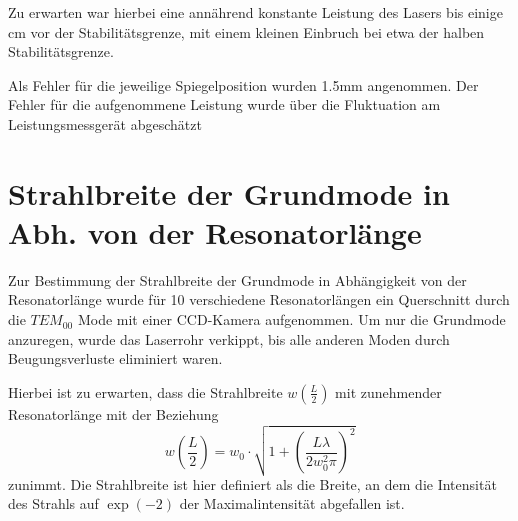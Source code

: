\documentclass[bigchapter,colorback,accentcolor=tud4b,linedtoc,11pt]{tudreport}
\numberwithin{equation}{subsection}
\begin{document}
Zu erwarten war hierbei eine annährend konstante Leistung des Lasers bis einige cm vor der Stabilitätsgrenze, mit einem kleinen Einbruch bei etwa der halben Stabilitätsgrenze.

Als Fehler für die jeweilige Spiegelposition wurden 1.5mm angenommen. Der Fehler für die aufgenommene Leistung wurde über die Fluktuation am Leistungsmessgerät abgeschätzt

\begin{center}
\begin{figure}[h]
\end{figure}
\end{center}

\FloatBarrier
\section{Strahlbreite der Grundmode in Abh. von der Resonatorlänge}
Zur Bestimmung der Strahlbreite der Grundmode in Abhängigkeit von der Resonatorlänge wurde für 10 verschiedene Resonatorlängen ein Querschnitt durch die $TEM_{00}$ Mode mit einer CCD-Kamera aufgenommen. Um nur die Grundmode anzuregen, wurde das Laserrohr verkippt, bis alle anderen Moden durch Beugungsverluste eliminiert waren.

Hierbei ist zu erwarten, dass die Strahlbreite $w\left(\frac{L}{2}\right)$ mit zunehmender Resonatorlänge mit der Beziehung 
$$w\left(\frac{L}{2}\right)=w_0\cdot\sqrt{1+\left({\frac{L\lambda}{2w_{0}^{2}\pi}}\right)^2}$$
zunimmt.
Die Strahlbreite ist hier definiert als die Breite, an dem die Intensität des Strahls auf $\exp(-2)$ der Maximalintensität abgefallen ist.
\end{document}
